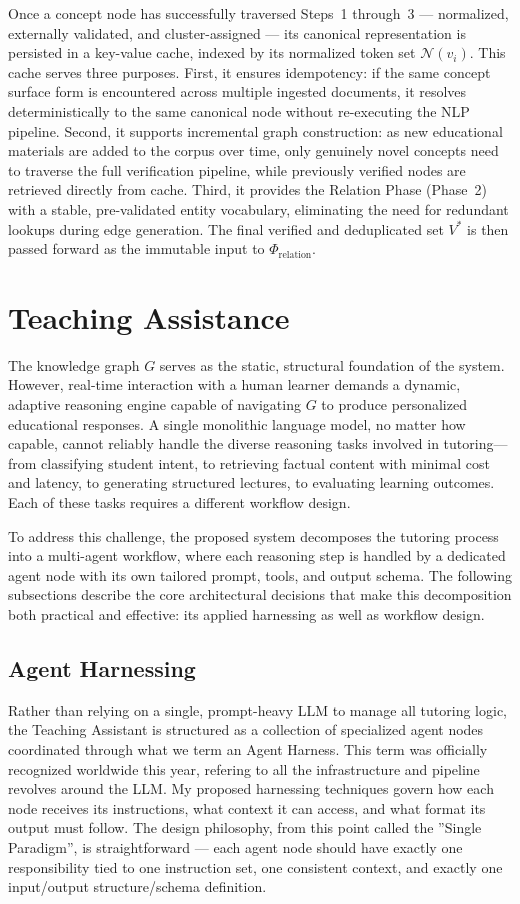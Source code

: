 Once a concept node has successfully traversed Steps~1 through~3 — normalized, externally validated, and cluster-assigned — its canonical representation is persisted 
in a key-value cache, indexed by its normalized token set $\mathcal{N}(v_i)$. This cache serves three purposes. First, it ensures  {idempotency}: if the same concept surface form is encountered across multiple ingested documents, it resolves deterministically to the same canonical node without re-executing the NLP pipeline. Second, it supports  {incremental graph construction}: as new educational materials are added to the corpus over time, only genuinely novel concepts need to traverse the full verification pipeline, while previously verified nodes are retrieved directly from cache. Third, it provides the Relation Phase (Phase~2) with a stable, pre-validated entity vocabulary, eliminating the need for redundant lookups during edge generation. The final verified and deduplicated set $V^{*}$ is then passed forward as the immutable input to $\Phi_{\text{relation}}$.
\section{Teaching Assistance}
The knowledge graph $G$ serves as the static, structural foundation of the system. However, real-time interaction with a human 
learner demands a dynamic, adaptive reasoning engine capable of navigating $G$ to produce personalized educational responses. 
A single monolithic language model, no matter how capable, cannot reliably handle the diverse reasoning tasks involved in 
tutoring---from classifying student intent, to retrieving factual content with minimal cost and latency, to generating structured 
lectures, to evaluating learning outcomes. Each of these tasks requires a different workflow design.

To address this challenge, the proposed system decomposes the tutoring process into a multi-agent workflow, where each reasoning 
step is handled by a dedicated agent node with its own tailored prompt, tools, and output schema. The following subsections 
describe the core architectural decisions that make this decomposition both practical and effective: its applied harnessing 
as well as workflow design.

\subsection{Agent Harnessing}

Rather than relying on a single, prompt-heavy LLM to manage all tutoring logic, the Teaching Assistant is structured as a collection of specialized agent nodes 
coordinated through what we term an {Agent Harness}. This term was officially recognized worldwide this year, refering to all the infrastructure 
and pipeline revolves around the LLM. My proposed harnessing techniques govern how each node receives its instructions, what context it can access, 
and what format its output must follow. The design philosophy, from this point called the  {''Single Paradigm''}, is straightforward --- 
each agent node should have exactly one responsibility tied to one instruction set, one consistent context, and exactly one input/output structure/schema definition. 

